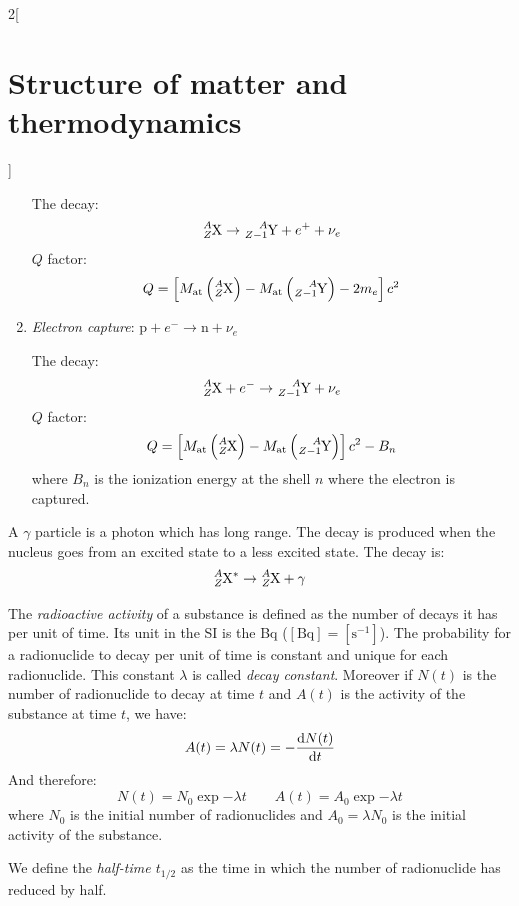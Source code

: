 \documentclass[../../../main.tex]{subfiles}
\begin{document}
\begin{multicols}{2}[\section{Structure of matter and thermodynamics}]
\begin{definition}
\begin{enumerate}
            The decay: $$\ce{^$A$_$Z$X}\rightarrow\ce{^$A$_$Z-1$Y}+e^++\nu_e$$
            $Q$ factor: $$Q=\left[M_\text{at}\left(\ce{^$A$_$Z$X}\right)-M_\text{at}\left(\ce{^$A$_$Z-1$Y}\right)-2m_e\right]c^2$$
      \item \textit{Electron capture}: $\text{p}+e^-\rightarrow\text{n}+\nu_e$\par
            The decay: $$\ce{^$A$_$Z$X}+e^-\rightarrow\ce{^$A$_$Z-1$Y}+\nu_e$$
            $Q$ factor: $$Q=\left[M_\text{at}\left(\ce{^$A$_$Z$X}\right)-M_\text{at}\left(\ce{^$A$_$Z-1$Y}\right)\right]c^2-B_n$$
            where $B_n$ is the ionization energy at the shell $n$ where the electron is captured.
    \end{enumerate}
  \end{definition}
  \begin{definition}
    A $\gamma$ particle is a photon which has long range. The decay is produced when the nucleus goes from an excited state to a less excited state. The decay is: $$\ce{^$A$_$Z$X}^*\rightarrow\ce{^$A$_$Z$X}+\gamma$$
  \end{definition}
  \begin{definition}
    The \textit{radioactive activity} of a substance is defined as the number of decays it has per unit of time. Its unit in the SI is the Bq ($[\text{Bq}]=[\text{s}^{-1}]$). The probability for a radionuclide to decay per unit of time is constant and unique for each radionuclide. This constant $\lambda$ is called \textit{decay constant}. Moreover if $N(t)$ is the number of radionuclide to decay at time $t$ and $A(t)$ is the activity of the substance at time $t$, we have:
    $$A(t)=\lambda N(t)=-\dv{N(t)}{t}$$ And therefore:
    $$N(t)=N_0\exp{-\lambda t}\qquad A(t)=A_0\exp{-\lambda t}$$
    where $N_0$ is the initial number of radionuclides and $A_0=\lambda N_0$ is the initial activity of the substance.
  \end{definition}
  \begin{definition}
    We define the \textit{half-time $t_{1/2}$} as the time in which the number of radionuclide has reduced by half.
  \end{definition}
  \begin{center}
    \begin{minipage}{\linewidth}
      \centering
      

\end{minipage}
\end{center}
\end{multicols}
\end{document}
